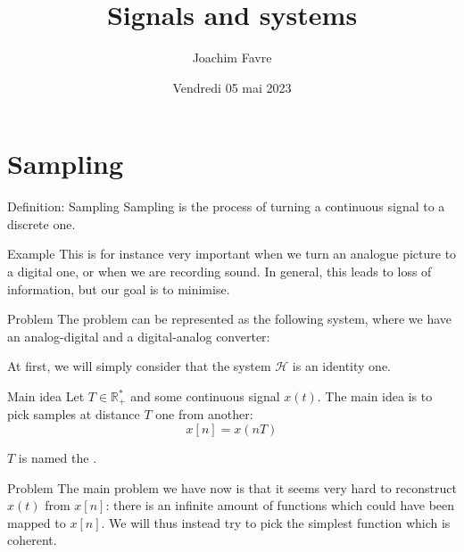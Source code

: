 \documentclass[a4paper]{article}
\title{Signals and systems}
\author{Joachim Favre}
\date{Vendredi 05 mai 2023}
\begin{document}
\maketitle


\section{Sampling}

\begin{parag}{Definition: Sampling}
    Sampling is the process of turning a continuous signal to a discrete one.
    
    \begin{subparag}{Example}
        This is for instance very important when we turn an analogue picture to a digital one, or when we are recording sound. In general, this leads to loss of information, but our goal is to minimise.
    \end{subparag}

    \begin{subparag}{Problem}
        The problem can be represented as the following system, where we have an analog-digital and a digital-analog converter:

        At first, we will simply consider that the system $\mathcal{H}$ is an identity one.
    \end{subparag}
\end{parag}

\begin{parag}{Main idea}
    Let $T \in \mathbb{R}^*_+$ and some continuous signal $x\left(t\right)$. The main idea is to pick samples at distance $T$ one from another: 
    \[x\left[n\right] = x\left(nT\right)\]
    
    $T$ is named the .

    \begin{subparag}{Problem}
        The main problem we have now is that it seems very hard to reconstruct $x\left(t\right)$ from $x\left[n\right]$: there is an infinite amount of functions which could have been mapped to $x\left[n\right]$. We will thus instead try to pick the simplest function which is coherent.
    \end{subparag}
\end{parag}
\end{document}
